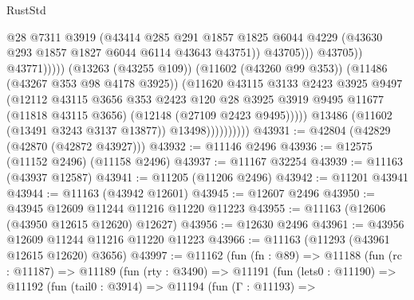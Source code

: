 \begin{lexlean}{RustStd}
\begin{coremodule}
                                              @28
                                              @7311
                                              @3919
                                              (@43414
                                                @285
                                                @291
                                                @1857
                                                @1825
                                                @6044
                                                @4229
                                                (@43630 @293 @1857 @1827 @6044 @6114 @43643 @43751))
                                              @43705)))
                                        @43705))
                                    @43771)))))
                          (@13263 (@43255 @109))
                          (@11602 (@43260 @99 @353))
                          (@11486 (@43267 @353 @98 @4178 @3925))
                          (@11620
                            @43115
                            @3133
                            @2423
                            @3925
                            @9497
                            (@12112
                              @43115
                              @3656
                              @353
                              @2423
                              @120
                              @28
                              @3925
                              @3919
                              @9495
                              @11677
                              (@11818 @43115 @3656)
                              (@12148 (@27109 @2423 @9495)))))
                        @13486
                        (@11602 (@13491 @3243 @3137 @13877))
                        @13498))))))))))
@43931 := @42804 (@42829 (@42870 (@42872 @43927)))
@43932 := @11146 @2496
@43936 := @12575 (@11152 @2496) (@11158 @2496)
@43937 := @11167 @32254
@43939 := @11163 (@43937 @12587)
@43941 := @11205 (@11206 @2496)
@43942 := @11201 @43941
@43944 := @11163 (@43942 @12601)
@43945 := @12607 @2496
@43950 := @43945 @12609 @11244 @11216 @11220 @11223
@43955 := @11163 (@12606 (@43950 @12615 @12620) @12627)
@43956 := @12630 @2496
@43961 := @43956 @12609 @11244 @11216 @11220 @11223
@43966 := @11163 (@11293 (@43961 @12615 @12620) @3656)
@43997 := @11162
    (fun (fn : @89) =>
    @11188
      (fun (rc : @11187) =>
      @11189
        (fun (rty : @3490) =>
        @11191
          (fun (lets0 : @11190) =>
          @11192
            (fun (tail0 : @3914) =>
            @11194
              (fun (Γ : @11193) =>

\end{coremodule}
\end{lexlean}
